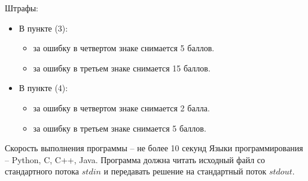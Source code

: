 Штрафы:
\begin{itemize}
    \item В пункте (3):
    \begin{itemize}
        \item за ошибку в четвертом знаке снимается 5 баллов.
        \item за ошибку в третьем знаке снимается 15 баллов.
    \end{itemize}
    \item В пункте (4):
    \begin{itemize}
        \item за ошибку в четвертом знаке снимается 2 балла.
        \item за ошибку в третьем знаке снимается 5 баллов.
    \end{itemize}
\end{itemize}

Скорость выполнения программы -- не более 10 секунд
Языки программирования -- Python, C, C++, Java.
Программа должна читать исходный файл со стандартного потока $stdin$ и передавать решение на стандартный поток $stdout$.
